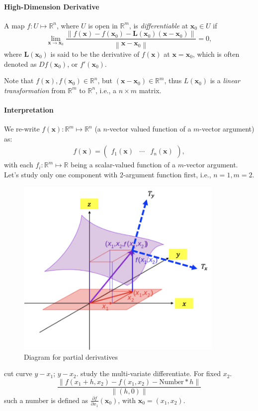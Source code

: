\paragraph{High-Dimension Derivative}
\begin{definition}[Differentiable]
A map $f:U\mapsto\mathbb{R}^n$, where $U$ is open in $\mathbb{R}^m$, is \emph{differentiable} at $\bm x_0\in U$ if
\begin{equation}
\lim_{\bm x\to\bm x_0}
\frac{
\left\|
f(\bm x) - f(\bm x_0) - \bm L(\bm x_0)(\bm x-\bm x_0)
\right\|
}{
\left\|
\bm x-\bm x_0
\right\|
}=0,
\end{equation}
where $\bm L(\bm x_0)$ is said to be the derivative of $f(\bm x)$ at $\bm x=\bm x_0$, which is often denoted as $Df(\bm x_0)$, or $f'(\bm x_0)$.
\end{definition}
\begin{remark}
Note that $f(\bm x),f(\bm x_0)\in\mathbb{R}^n$, but $(\bm x-\bm x_0)\in\mathbb{R}^m$, thus $L(\bm x_0)$ is a \emph{linear transformation} from $\mathbb{R}^m$ to $\mathbb{R}^n$, i.e., a $n\times m$ matrix. 
\end{remark}
\paragraph{Interpretation}
We re-write $f(\bm x): \mathbb{R}^m\mapsto\mathbb{R}^n$ (a $n$-vector valued function of a $m$-vector argument) as:
\[
\begin{array}{l}
f(\bm x)=\begin{pmatrix}
f_1(\bm x)&\cdots&f_n(\bm x)
\end{pmatrix},
\end{array}
\]
with each $f_i:\mathbb{R}^m\mapsto\mathbb{R}$ being a scalar-valued function of a $m$-vector argument. Let's study only one component with $2$-argument function first, i.e., $n=1,m=2$. 
\begin{figure}[H]
\centering
\includegraphics[width=10cm]{week9/f_9_1}
\caption{Diagram for partial derivatives}
\end{figure}
cut curve $y-x_1$; $y-x_2$. study the multi-variate differentiate. For fixed $x_2$.
\[
\frac{\|f(x_1+h,x_2) - f(x_1,x_2)-\mbox{Number} * h\|}{\|(h,0)\|}
\]
such a number is defined as $\frac{\partial f}{\partial x_1}(\bm x_0)$, with $\bm x_0=(x_1,x_2)$.

